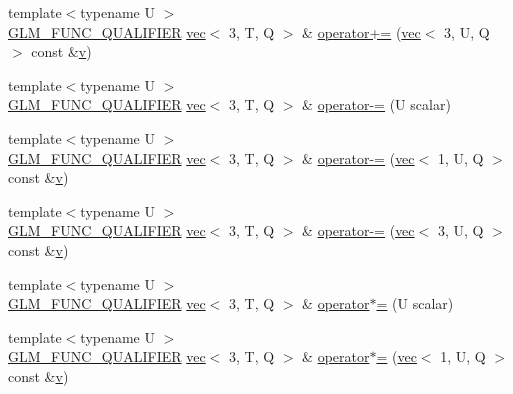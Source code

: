 \begin{DoxyCompactItemize}
{\footnotesize template$<$typename U $>$ }\\\mbox{\hyperlink{setup_8hpp_a33fdea6f91c5f834105f7415e2a64407}{G\+L\+M\+\_\+\+F\+U\+N\+C\+\_\+\+Q\+U\+A\+L\+I\+F\+I\+ER}} \mbox{\hyperlink{structglm_1_1vec}{vec}}$<$ 3, T, Q $>$ \& \mbox{\hyperlink{structglm_1_1vec_3_013_00_01_t_00_01_q_01_4_a6e025799ccd139ed94645bf141eed279}{operator+=}} (\mbox{\hyperlink{structglm_1_1vec}{vec}}$<$ 3, U, Q $>$ const \&\mbox{\hyperlink{_s_d_l__opengl_8h_a10a82eabcb59d2fcd74acee063775f90}{v}})
\item 
{\footnotesize template$<$typename U $>$ }\\\mbox{\hyperlink{setup_8hpp_a33fdea6f91c5f834105f7415e2a64407}{G\+L\+M\+\_\+\+F\+U\+N\+C\+\_\+\+Q\+U\+A\+L\+I\+F\+I\+ER}} \mbox{\hyperlink{structglm_1_1vec}{vec}}$<$ 3, T, Q $>$ \& \mbox{\hyperlink{structglm_1_1vec_3_013_00_01_t_00_01_q_01_4_a806d4a3b1fa79272d2b5ca58c62b95c1}{operator-\/=}} (U scalar)
\item 
{\footnotesize template$<$typename U $>$ }\\\mbox{\hyperlink{setup_8hpp_a33fdea6f91c5f834105f7415e2a64407}{G\+L\+M\+\_\+\+F\+U\+N\+C\+\_\+\+Q\+U\+A\+L\+I\+F\+I\+ER}} \mbox{\hyperlink{structglm_1_1vec}{vec}}$<$ 3, T, Q $>$ \& \mbox{\hyperlink{structglm_1_1vec_3_013_00_01_t_00_01_q_01_4_ac0d8da1814d255fc6876b12519cccfb8}{operator-\/=}} (\mbox{\hyperlink{structglm_1_1vec}{vec}}$<$ 1, U, Q $>$ const \&\mbox{\hyperlink{_s_d_l__opengl_8h_a10a82eabcb59d2fcd74acee063775f90}{v}})
\item 
{\footnotesize template$<$typename U $>$ }\\\mbox{\hyperlink{setup_8hpp_a33fdea6f91c5f834105f7415e2a64407}{G\+L\+M\+\_\+\+F\+U\+N\+C\+\_\+\+Q\+U\+A\+L\+I\+F\+I\+ER}} \mbox{\hyperlink{structglm_1_1vec}{vec}}$<$ 3, T, Q $>$ \& \mbox{\hyperlink{structglm_1_1vec_3_013_00_01_t_00_01_q_01_4_a4430e8bea2a290bbcd6507102d37914d}{operator-\/=}} (\mbox{\hyperlink{structglm_1_1vec}{vec}}$<$ 3, U, Q $>$ const \&\mbox{\hyperlink{_s_d_l__opengl_8h_a10a82eabcb59d2fcd74acee063775f90}{v}})
\item 
{\footnotesize template$<$typename U $>$ }\\\mbox{\hyperlink{setup_8hpp_a33fdea6f91c5f834105f7415e2a64407}{G\+L\+M\+\_\+\+F\+U\+N\+C\+\_\+\+Q\+U\+A\+L\+I\+F\+I\+ER}} \mbox{\hyperlink{structglm_1_1vec}{vec}}$<$ 3, T, Q $>$ \& \mbox{\hyperlink{structglm_1_1vec_3_013_00_01_t_00_01_q_01_4_ac8d11ce47b7e6cf747d9e9710c422fb3}{operator$\ast$=}} (U scalar)
\item 
{\footnotesize template$<$typename U $>$ }\\\mbox{\hyperlink{setup_8hpp_a33fdea6f91c5f834105f7415e2a64407}{G\+L\+M\+\_\+\+F\+U\+N\+C\+\_\+\+Q\+U\+A\+L\+I\+F\+I\+ER}} \mbox{\hyperlink{structglm_1_1vec}{vec}}$<$ 3, T, Q $>$ \& \mbox{\hyperlink{structglm_1_1vec_3_013_00_01_t_00_01_q_01_4_abf00e0a1c52a2ea28c89b50edec4b722}{operator$\ast$=}} (\mbox{\hyperlink{structglm_1_1vec}{vec}}$<$ 1, U, Q $>$ const \&\mbox{\hyperlink{_s_d_l__opengl_8h_a10a82eabcb59d2fcd74acee063775f90}{v}})

\end{DoxyCompactItemize}

